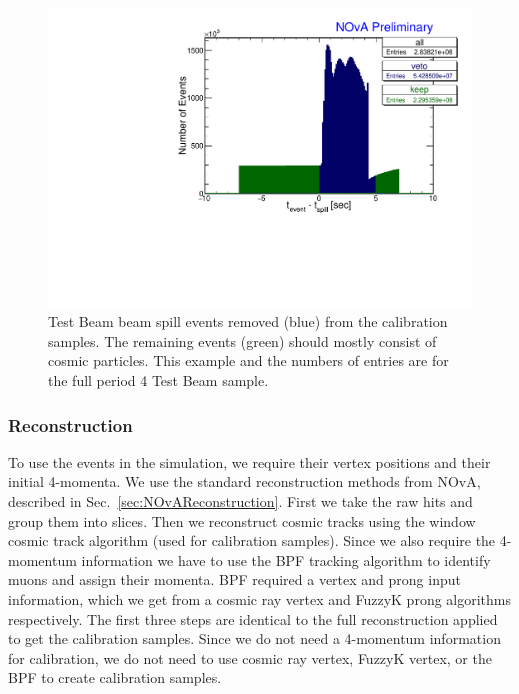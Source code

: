 \begin{figure}[hbtp]
\centering
\includegraphics[width=\textwidth]{Plots/TBCalibration/RemoveTBSpills.pdf}
\caption[Removing Test Beam beam spill]{Test Beam beam spill events removed (blue) from the calibration samples. The remaining events (green) should mostly consist of cosmic particles. This example and the numbers of entries are for the full period 4 Test Beam sample.}
\label{fig:RemoveTBSpills}
\end{figure}

\subsubsection*{Reconstruction}
To use the events in the simulation, we require their vertex positions and their initial 4-momenta. We use the standard reconstruction methods from \gls{NOvA}, described in Sec.~\ref{sec:NOvAReconstruction}. First we take the raw hits and group them into slices. Then we reconstruct cosmic tracks using the window cosmic track algorithm (used for calibration samples). Since we also require the 4-momentum information we have to use the \gls{BPF} tracking algorithm to identify muons and assign their momenta. \gls{BPF} required a vertex and prong input information, which we get from a cosmic ray vertex and FuzzyK prong algorithms respectively. The first three steps are identical to the full reconstruction applied to get the calibration samples. Since we do not need a 4-momentum information for calibration, we do not need to use cosmic ray vertex, FuzzyK vertex, or the \gls{BPF} to create calibration samples.

